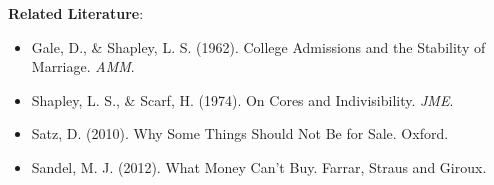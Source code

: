 \textbf{Related Literature}:
\begin{itemize}
    \item Gale, D., \& Shapley, L. S. (1962). College Admissions and the Stability of Marriage. \textit{AMM}.
    \item Shapley, L. S., \& Scarf, H. (1974). On Cores and Indivisibility. \textit{JME}.
    \item Satz, D. (2010). Why Some Things Should Not Be for Sale. Oxford.
    \item Sandel, M. J. (2012). What Money Can't Buy. Farrar, Straus and Giroux.
\end{itemize}


